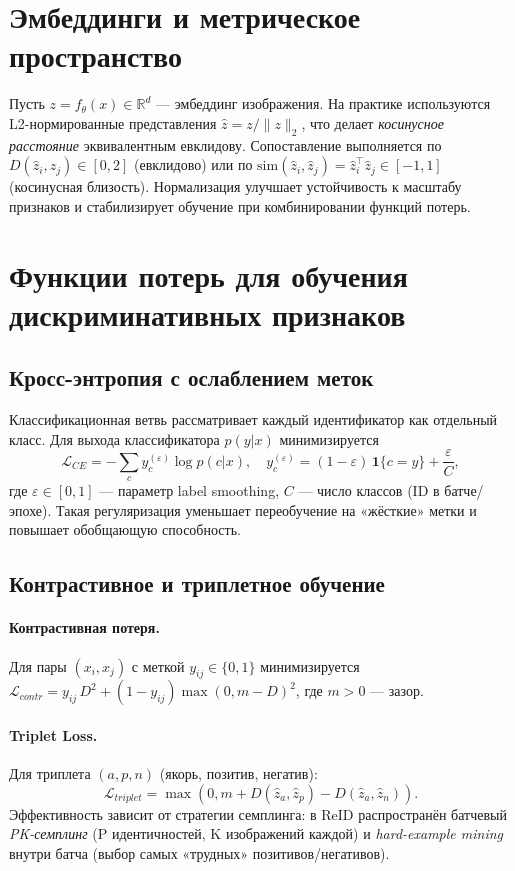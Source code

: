 \section{Эмбеддинги и метрическое пространство}
Пусть \(z=f_\theta(x)\in\mathbb{R}^d\) — эмбеддинг изображения. На практике используются L2-нормированные представления \(\hat z = z/\|z\|_2\), что делает \emph{косинусное расстояние} эквивалентным евклидову. Сопоставление выполняется по \(D(\hat z_i,\hat z_j)\in[0,2]\) (евклидово) или по \(\mathrm{sim}(\hat z_i,\hat z_j)=\hat z_i^\top \hat z_j\in[-1,1]\) (косинусная близость). Нормализация улучшает устойчивость к масштабу признаков и стабилизирует обучение при комбинировании функций потерь.

\section{Функции потерь для обучения дискриминативных признаков}
\subsection{Кросс-энтропия с ослаблением меток}
Классификационная ветвь рассматривает каждый идентификатор как отдельный класс. Для выхода классификатора \(p(y|x)\) минимизируется
\begin{equation}
\mathcal{L}_{CE} = - \sum_{c} y^{(\varepsilon)}_c \log p(c|x), \quad
y^{(\varepsilon)}_c = (1-\varepsilon)\,\mathbf{1}\{c{=}y\} + \frac{\varepsilon}{C},
\end{equation}
где \(\varepsilon\in[0,1]\) — параметр label smoothing, \(C\) — число классов (ID в батче/эпохе). Такая регуляризация уменьшает переобучение на «жёсткие» метки и повышает обобщающую способность.

\subsection{Контрастивное и триплетное обучение}
\paragraph{Контрастивная потеря.} Для пары \((x_i,x_j)\) с меткой \(y_{ij}\in\{0,1\}\) минимизируется
\(\mathcal{L}_{contr} = y_{ij}\,D^2 + (1-y_{ij})\max(0,m - D)^2\), где \(m>0\) — зазор.
\paragraph{Triplet Loss.} Для триплета \((a,p,n)\) (якорь, позитив, негатив):
\begin{equation}
\mathcal{L}_{triplet} = \max\left(0, m + D(\hat z_a,\hat z_p) - D(\hat z_a,\hat z_n)\right).
\end{equation}
Эффективность зависит от стратегии семплинга: в ReID распространён батчевый \emph{PK-семплинг} (P идентичностей, K изображений каждой) и \emph{hard-example mining} внутри батча (выбор самых «трудных» позитивов/негативов).

